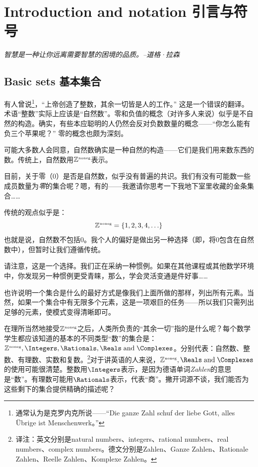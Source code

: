 \chapter{Introduction and notation \quad \quad 引言与符号}
\label{ch:intro}

{\em 智慧是一种让你远离需要智慧的困境的品质。--道格·拉森}

\section{Basic sets 基本集合}
\label{sec:basic}

有人曾说\footnote{通常认为是克罗内克所说——“Die ganze Zahl schuf der liebe Gott, alles \"{U}brige ist Menschenwerk。”}，“上帝创造了整数，其余一切皆是人的工作。” 这是一个错误的翻译。术语“整数”实际上应该是“自然数”。零和负值的概念（对许多人来说）似乎是不自然的构造。确实，有些本应聪明的人仍然会反对负数数量的概念——“你怎么能有负三个苹果呢？” 零的概念也颇为深刻。


可能大多数人会同意，自然数确实是一种自然的构造——它们是我们用来数东西的数。传统上，自然数用${\mathbb Z}^{\mbox{\tiny noneg}}$表示。


目前，关于零（$0$）是否是自然数，似乎没有普遍的共识。我们有没有可能数一些成员数量为\emph{零}的集合呢？嗯，有的——我邀请你思考一下我地下室里收藏的金条集合……

传统的观点似乎是：
\[ {\mathbb Z}^{\mbox{\tiny noneg}} = \{1, 2, 3, 4, \ldots \} \]
\noindent 也就是说，自然数不包括0。我个人的偏好是做出另一种选择（即，将$0$包含在自然数中），但暂时让我们遵循传统。


\noindent 请注意，这是一个选择。我们正在采纳一种惯例。如果在其他课程或其他数学环境中，你发现另一种惯例更受青睐，那么，学会灵活变通是件好事……


也许说明一个集合是什么的最好方式是像我们上面所做的那样，列出所有元素。当然，如果一个集合中有无限多个元素，这是一项艰巨的任务——所以我们只需列出足够的元素，使模式变得清晰即可。

在理所当然地接受${\mathbb Z}^{\mbox{\tiny noneg}}$之后，人类所负责的“其余一切”指的是什么呢？每个数学学生都应该知道的基本的不同类型“数”的集合是：$\Naturals, \Integers, \Rationals, \Reals\; \mbox{and} \; \Complexes$。分别代表：自然数、整数、有理数、实数和复数。\footnote{译注：英文分别是natural numbers、integers、rational numbers、real numbers、complex numbers。德文分别是Zahlen、Ganze Zahlen、Rationale Zahlen、Reelle Zahlen、Komplexe Zahlen。}对于讲英语的人来说，$\Naturals, \Reals \; \mbox{and} \; \Complexes$的使用可能很清楚。整数用$\Integers$表示，是因为德语单词{\em Zahlen}的意思是“数”。有理数可能用$\Rationals$表示，代表“商”。撇开词源不谈，我们能否为这些剩下的集合提供精确的描述呢？

